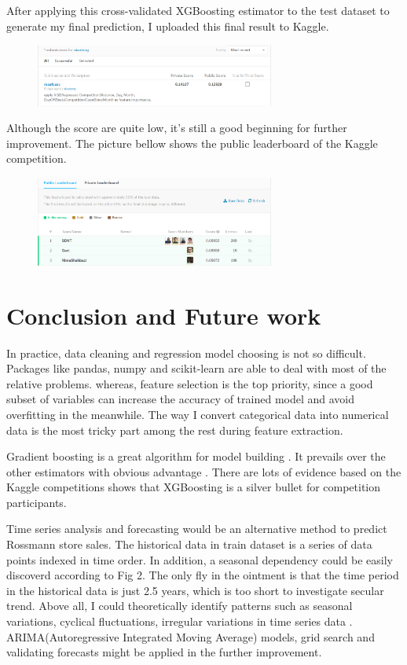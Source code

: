 \documentclass[11pt, a4paper, leqno]{article}
\begin{document}
After applying this cross-validated XGBoosting estimator to the test dataset to generate my final prediction, I uploaded this final result to Kaggle.
\begin{figure}[h]
\centering
\includegraphics[width=0.7\textwidth]{formulas/submission.png}
\end{figure}

Although the score are quite low, it's still a good beginning for further improvement. The picture bellow shows the public  leaderboard of the Kaggle competition.

\begin{figure}[h]
\centering
\includegraphics[width=0.7\textwidth]{formulas/leader.png}
\end{figure}

\section{Conclusion and Future work}

In practice, data cleaning and regression model choosing is not so difficult. Packages like pandas, numpy and scikit-learn are able to deal with most of the relative problems. whereas, feature selection is the top priority, since a good subset of variables can increase the accuracy of trained model and avoid overfitting in the meanwhile. The way I convert categorical data into numerical data is the most tricky part among the rest during feature extraction.

Gradient boosting is a great algorithm for model building \cite{chen2015xgboost}. It prevails over the other estimators with obvious advantage \cite{ke2017lightgbm}. There are lots of evidence based on the Kaggle competitions shows that XGBoosting is a silver bullet for competition participants.

Time series analysis and forecasting would be an alternative method to predict Rossmann store sales. The historical data in train dataset is a series of data points indexed in time order. In addition, a seasonal dependency could be easily discoverd according to Fig 2. The only fly in the ointment is that the time period in the historical data is just 2.5 years, which is too short to investigate secular trend. Above all, I could theoretically identify patterns such as seasonal variations, cyclical fluctuations, irregular variations in time series data \cite{han1999efficient}. ARIMA(Autoregressive Integrated Moving Average) models, grid search and validating forecasts might be applied in the further improvement.







\end{document}
